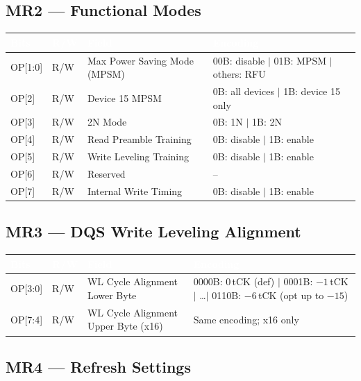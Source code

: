 \documentclass[10pt,a4paper,twoside]{article}
\newcommand{\thd}[1]{\cellcolor{navyblue}\textcolor{white}{\textbf{#1}}}
\newcommand{\trow}{\rowcolor{lightgray}}
\newcommand{\talt}{\rowcolor{skyblue!30}}
\begin{document}
\subsection{MR2 --- Functional Modes}

\begin{center}
\begin{tabularx}{\linewidth}{@{} l l l X @{}}
\toprule
\thd{Bits} & \thd{R/W} & \thd{Field} & \thd{Encoding} \\
\midrule
\trow OP[1:0] & R/W & Max Power Saving Mode (MPSM) & 00B: disable $|$ 01B: MPSM $|$ others: RFU \\
\talt OP[2] & R/W & Device 15 MPSM & 0B: all devices $|$ 1B: device 15 only \\
\trow OP[3] & R/W & 2N Mode & 0B: 1N $|$ 1B: 2N \\
\talt OP[4] & R/W & Read Preamble Training & 0B: disable $|$ 1B: enable \\
\trow OP[5] & R/W & Write Leveling Training & 0B: disable $|$ 1B: enable \\
\talt OP[6] & R/W & Reserved & -- \\
\trow OP[7] & R/W & Internal Write Timing & 0B: disable $|$ 1B: enable \\
\bottomrule
\end{tabularx}
\end{center}

\subsection{MR3 --- DQS Write Leveling Alignment}

\begin{center}
\begin{tabularx}{\linewidth}{@{} l l l X @{}}
\toprule
\thd{Bits} & \thd{R/W} & \thd{Field} & \thd{Encoding} \\
\midrule
\trow OP[3:0] & R/W & WL Cycle Alignment Lower Byte &
  0000B: 0\,tCK (def) $|$ 0001B: $-1$\,tCK $|$ \ldots $|$ 0110B: $-6$\,tCK (opt up to $-15$) \\
\talt OP[7:4] & R/W & WL Cycle Alignment Upper Byte (x16) & Same encoding; x16 only \\
\bottomrule
\end{tabularx}
\end{center}

\subsection{MR4 --- Refresh Settings}
\end{document}
